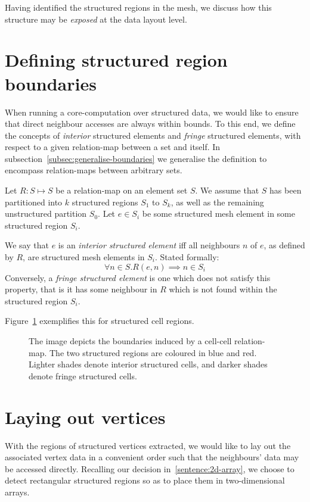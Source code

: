 \label{chap:recharting-maps}
Having identified the structured regions in the mesh, we discuss how this structure may be \emph{exposed} at the data layout level.


\section{Defining structured region boundaries}
When running a core-computation over structured data, we would like to ensure that direct neighbour accesses are always within bounds. To this end, we define the concepts of \emph{interior} structured elements and \emph{fringe} structured elements, with respect to a given relation-map between a set and itself. In subsection~\ref{subsec:generalise-boundaries} we generalise the definition to encompass relation-maps between arbitrary sets.

Let $R: S \mapsto S$ be a relation-map on an element set $S$. We assume that $S$ has been partitioned into $k$ structured regions $S_1$ to $S_k$, as well as the remaining unstructured partition $S_0$.
Let $e \in S_i$ be some structured mesh element in some structured region $S_i$.

We say that $e$ is an \emph{interior structured element} iff all neighbours $n$ of $e$, as defined by $R$, are structured mesh elements in $S_i$. Stated formally:
$$\forall n \in S. R(e,n) \implies n \in S_i$$
Conversely, a \emph{fringe structured element} is one which does not satisfy this property, that is it has some neighbour in $R$ which is not found within the structured region $S_i$.

Figure~\ref{fig:fringe-cells} exemplifies this for structured cell regions.

\begin{figure}

\caption{The image depicts the boundaries induced by a cell-cell relation-map. The two structured regions are coloured in blue and red. Lighter shades denote interior structured cells, and darker shades denote fringe structured cells.}
\label{fig:fringe-cells}
\end{figure}


\section{Laying out vertices}
\label{subsec:vertex-associative-data}
With the regions of structured vertices extracted, we would like to lay out the associated vertex data in a convenient order such that the neighbours' data may be accessed directly. Recalling our decision in~\ref{sentence:2d-array}, we choose to detect rectangular structured regions so as to place them in two-dimensional arrays.

